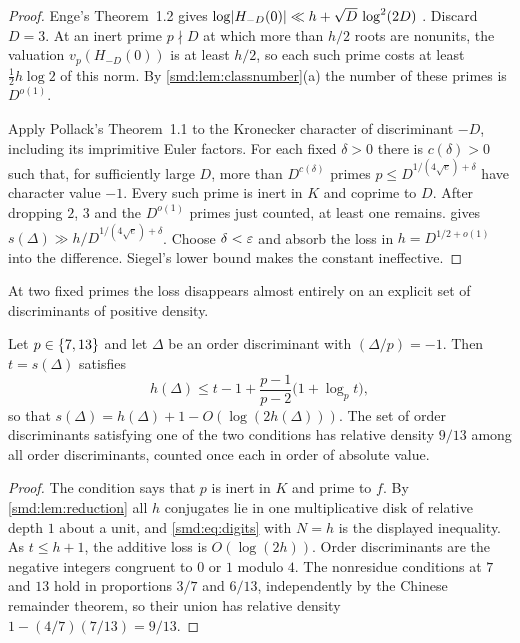 \begin{proof}
Enge's Theorem~1.2 gives $\log\lvert H_{-D}(0)\rvert\ll h+\sqrt D\,\log^2(2D)$
\cite{Enge2006Complexity}. Discard $D=3$. At an inert prime $p\nmid D$ at which more than
$h/2$ roots are nonunits, the valuation $v_p(H_{-D}(0))$ is at least $h/2$, so each such
prime costs at least $\tfrac12h\log2$ of this norm. By \cref{smd:lem:classnumber}(a) the
number of these primes is $D^{o(1)}$.

Apply Pollack's Theorem~1.1 \cite{Pollack2015Bounds} to the Kronecker character of
discriminant $-D$, including its imprimitive Euler factors. For each fixed $\delta>0$
there is $c(\delta)>0$ such that, for sufficiently large $D$, more than $D^{c(\delta)}$
primes $p\le D^{1/(4\sqrt e)+\delta}$ have character value $-1$. Every such prime is inert
in $K$ and coprime to $D$. After dropping $2$, $3$ and the $D^{o(1)}$ primes just counted,
at least one remains.  gives
$s(\Delta)\gg h/D^{1/(4\sqrt e)+\delta}$. Choose $\delta<\varepsilon$ and absorb the loss in
$h=D^{1/2+o(1)}$ into the difference. Siegel's lower bound makes the constant ineffective.
\end{proof}

At two fixed primes the loss disappears almost entirely on an explicit set of
discriminants of positive density.

\begin{theorem}\label{smd:thm:nearfull}
Let $p\in\{7,13\}$ and let $\Delta$ be an order discriminant with $(\Delta/p)=-1$.
Then $t=s(\Delta)$ satisfies
\[
 h(\Delta)\le t-1+\frac{p-1}{p-2}\bigl(1+\log_pt\bigr),
\]
so that $s(\Delta)=h(\Delta)+1-O(\log(2h(\Delta)))$. The set of order discriminants
satisfying one of the two conditions has relative density $9/13$ among all order
discriminants, counted once each in order of absolute value.
\end{theorem}

\begin{proof}
The condition says that $p$ is inert in $K$ and prime to $f$. By \cref{smd:lem:reduction}
all $h$ conjugates lie in one multiplicative disk of relative depth $1$ about a unit, and
\eqref{smd:eq:digits} with $N=h$ is the displayed inequality. As $t\le h+1$, the additive
loss is $O(\log(2h))$. Order discriminants are the negative integers congruent to $0$ or
$1$ modulo $4$. The nonresidue conditions at $7$ and $13$ hold in proportions $3/7$ and
$6/13$, independently by the Chinese remainder theorem, so their union has relative density
$1-(4/7)(7/13)=9/13$.
\end{proof}

